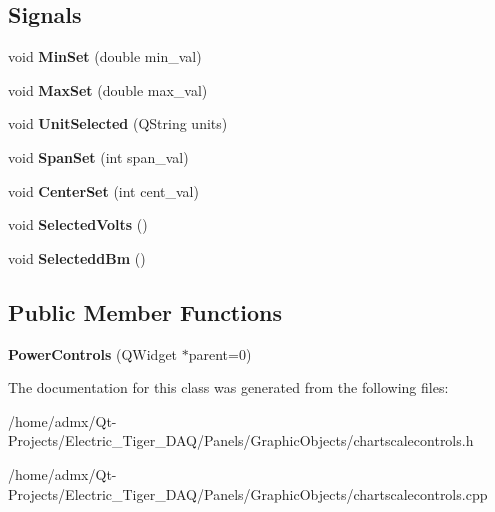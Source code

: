 \subsection*{Signals}
\begin{DoxyCompactItemize}
\item 
\hypertarget{class_power_controls_ab9a1d9f89f194471d0e31f6dad01086a}{void {\bfseries Min\+Set} (double min\+\_\+val)}\label{class_power_controls_ab9a1d9f89f194471d0e31f6dad01086a}

\item 
\hypertarget{class_power_controls_aef88de9bf3ae6738020c9334ee79e857}{void {\bfseries Max\+Set} (double max\+\_\+val)}\label{class_power_controls_aef88de9bf3ae6738020c9334ee79e857}

\item 
\hypertarget{class_power_controls_a6077789456f1780b9f86569256334a38}{void {\bfseries Unit\+Selected} (Q\+String units)}\label{class_power_controls_a6077789456f1780b9f86569256334a38}

\item 
\hypertarget{class_power_controls_ad146203ff843dd336cca6838be0aa9b4}{void {\bfseries Span\+Set} (int span\+\_\+val)}\label{class_power_controls_ad146203ff843dd336cca6838be0aa9b4}

\item 
\hypertarget{class_power_controls_a79b389c9c31f94eb5b0ae8fc771b1c7d}{void {\bfseries Center\+Set} (int cent\+\_\+val)}\label{class_power_controls_a79b389c9c31f94eb5b0ae8fc771b1c7d}

\item 
\hypertarget{class_power_controls_a3da815aa3bab7ba24273c1eac5ee32e5}{void {\bfseries Selected\+Volts} ()}\label{class_power_controls_a3da815aa3bab7ba24273c1eac5ee32e5}

\item 
\hypertarget{class_power_controls_a8a2eb48c9ed37db4cf934f022b7c556f}{void {\bfseries Selectedd\+Bm} ()}\label{class_power_controls_a8a2eb48c9ed37db4cf934f022b7c556f}

\end{DoxyCompactItemize}
\subsection*{Public Member Functions}
\begin{DoxyCompactItemize}
\item 
\hypertarget{class_power_controls_a73bb29ad05d93d0d945596b02b3a058a}{{\bfseries Power\+Controls} (Q\+Widget $\ast$parent=0)}\label{class_power_controls_a73bb29ad05d93d0d945596b02b3a058a}

\end{DoxyCompactItemize}


The documentation for this class was generated from the following files\+:\begin{DoxyCompactItemize}
\item 
/home/admx/\+Qt-\/\+Projects/\+Electric\+\_\+\+Tiger\+\_\+\+D\+A\+Q/\+Panels/\+Graphic\+Objects/chartscalecontrols.\+h\item 
/home/admx/\+Qt-\/\+Projects/\+Electric\+\_\+\+Tiger\+\_\+\+D\+A\+Q/\+Panels/\+Graphic\+Objects/chartscalecontrols.\+cpp\end{DoxyCompactItemize}
